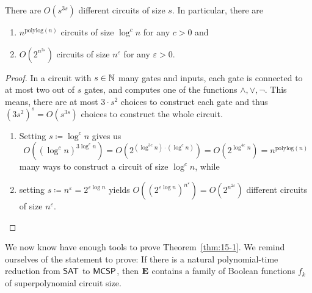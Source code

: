 \documentclass[11pt]{article}
\begin{document}
\begin{lemma}
  \label{lem:num-of-circs}
  There are $O(s^{3s})$ different circuits of size $s$.
  In particular, there are
  \begin{enumerate}
    \item $n^{\mathrm{polylog}(n)}$ circuits of size $\log^c n$ for any
      $c > 0$ and

    \item $O(2^{n^{2 \varepsilon}})$ circuits of size
      $n^\varepsilon$ for any $\varepsilon > 0$.
  \end{enumerate}
\end{lemma}

\begin{proof}
  In a circuit with $s \in {\mathbb{N}}$ many gates and inputs, each gate is connected to
  at most two out of $s$ gates, and computes one of the functions
  $\land, \lor, \neg$.
  This means, there are at most $3 \cdot s^2$ choices to construct each gate
  and thus $(3 s^2)^s = O(s^{3s})$ choices to construct the whole circuit.

  \begin{enumerate}
    \item Setting $s \coloneqq \log^c n$ gives us
      \[
        O((\log^c n)^{3 \log^c n})
        =
        O(2^{(\log^{3c} n) \cdot (\log^c n)})
        =
        O(2^{\log^{4c} n})
        =
        n^{\mathrm{polylog}(n)}
      \]
      many ways to construct a circuit of size $\log^c n$, while

    \item setting $s \coloneqq n^\varepsilon = 2^{\varepsilon \log n}$ yields
      $
        O((2^{\varepsilon \log n})^{n^\varepsilon})
        =
        O(2^{n^{2 \varepsilon}})
      $
      different circuits of size $n^\varepsilon$.
  \end{enumerate}
\end{proof}

We now know have enough tools to prove Theorem~\ref{thm:15-1}.
We remind ourselves of the statement to prove:
If there is a natural polynomial-time reduction from
$\mathsf{SAT}$ to $\mathsf{MCSP}$, then $\mathbf{E}$
contains a family of Boolean functions $f_k$ of superpolynomial circuit
size.
\end{document}
